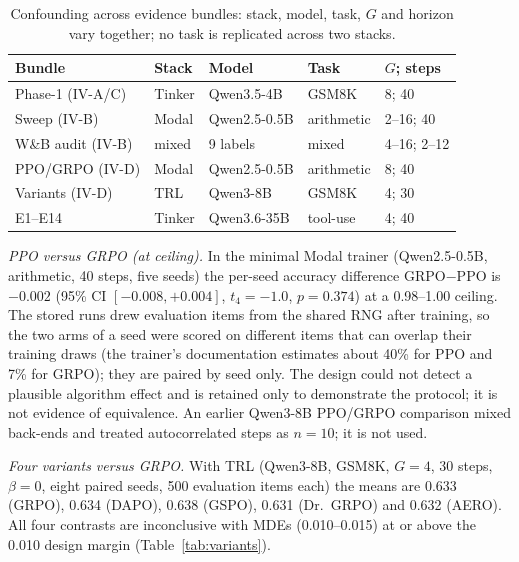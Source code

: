 \documentclass[conference]{IEEEtran}
\begin{document}
\begin{table}[t]
\caption{Confounding across evidence bundles: stack, model, task, $G$ and
horizon vary together; no task is replicated across two stacks.}
\label{tab:confound}
\centering
\footnotesize
\setlength{\tabcolsep}{2pt}
\begin{tabular}{@{}lllll@{}}
\toprule
Bundle & Stack & Model & Task & $G$; steps \\
\midrule
Phase-1 (IV-A/C) & Tinker & Qwen3.5-4B & GSM8K & 8; 40 \\
Sweep (IV-B) & Modal & Qwen2.5-0.5B & arithmetic & 2--16; 40 \\
W\&B audit (IV-B) & mixed & 9 labels & mixed & 4--16; 2--12 \\
PPO/GRPO (IV-D) & Modal & Qwen2.5-0.5B & arithmetic & 8; 40 \\
Variants (IV-D) & TRL & Qwen3-8B & GSM8K & 4; 30 \\
E1--E14 & Tinker & Qwen3.6-35B & tool-use & 4; 40 \\
\bottomrule
\end{tabular}
\end{table}

\emph{PPO versus GRPO (at ceiling).} In the minimal Modal trainer
(Qwen2.5-0.5B, arithmetic, 40 steps, five seeds) the per-seed accuracy
difference GRPO$-$PPO is $-0.002$ (95\% CI $[-0.008,+0.004]$, $t_4=-1.0$,
$p=0.374$) at a 0.98--1.00 ceiling. The stored runs drew evaluation items
from the shared RNG after training, so the two arms of a seed were scored on
different items that can overlap their training draws (the trainer's
documentation estimates about 40\% for PPO and 7\% for GRPO); they are paired
by seed only. The design could not detect a plausible algorithm effect and
is retained only to demonstrate the protocol; it is not evidence of
equivalence. An earlier Qwen3-8B PPO/GRPO comparison mixed back-ends and
treated autocorrelated steps as $n=10$; it is not used.

\emph{Four variants versus GRPO.} With TRL (Qwen3-8B, GSM8K, $G=4$, 30
steps, $\beta=0$, eight paired seeds, 500 evaluation items each) the means
are 0.633 (GRPO), 0.634 (DAPO), 0.638 (GSPO), 0.631 (Dr.\ GRPO) and 0.632
(AERO). All four contrasts are inconclusive with MDEs (0.010--0.015) at or
above the 0.010 design margin (Table~\ref{tab:variants}).
\end{document}

